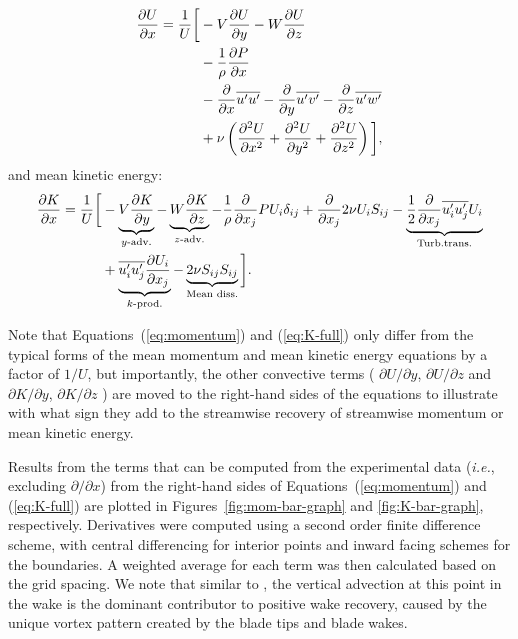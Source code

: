 \documentclass[energies,article,accept,moreauthors,pdftex,10pt,a4paper]{mdpi}
\def \p{\partial}
\theoremstyle{mdpi}
\newcounter{ex}
\newcounter{re}
\begin{document}
\begin{equation}
	\begin{split}
		\frac{\p U}{\p x} = 
		\frac{1}{U} \bigg{[}
		& - V\frac{\p U}{\p y}
		- W\frac{\p U}{\p z} \\
		& -\frac{1}{\rho}\frac{\p P}{\p x} \\
		& - \frac{\p}{\p x} \overline{u'u'}
		- \frac{\p}{\p y} \overline{u'v'}
		- \frac{\p}{\p z} \overline{u'w'} \\
		& + \nu\left(\frac{\p^2 U}{\p x^2}
		+ \frac{\p^2 U}{\p y^2}
		+ \frac{\p^2 U}{\p z^2} \right)
		\bigg{]},
	\end{split}
	\label{eq:momentum}
\end{equation}
and mean kinetic energy:
\begin{equation}
	\begin{split}
		\frac{\p K}{\p x}
		=
		\frac{1}{U}
		\bigg{[}
		& - \underbrace{V \frac{\p K}{\p y}}_{y\text{-adv.%
		}}
		- \underbrace{W \frac{\p K}{\p z}}_{z\text{-adv.}}
		- \frac{1}{\rho}\frac{\p}{\p x_j} P U_i \delta_{ij}
		+ \frac{\p}{\p x_j} 2 \nu U_i S_{ij} %
		- \underbrace{
		\frac{1}{2}\frac{\p}{\p x_j} \overline{u_i' u_j'} U_i
		}_{\text{Turb.%
		trans.%
		}} \\
		& + 
		\underbrace{
		\overline{u_i' u_j'} \frac{\p U_i}{\p x_j}
		}_{k\text{-prod.%
		}}
		- 
		\underbrace{
		2 \nu S_{ij}S_{ij}
		}_{\text{Mean diss.%
		}}
		\bigg{]}.
	\label{eq:K-full}
	\end{split}
\end{equation}

Note that Equations~(\ref{eq:momentum}) and (\ref{eq:K-full}) only differ from the
typical forms of the mean momentum and mean kinetic energy equations by a factor
of $1/U$, but importantly, the other convective terms ( $\partial U/\partial y$,
$\partial U/\partial z$ and $\partial K/\partial y$, $\partial K/\partial z$ )
are moved to the right-hand sides of the equations to illustrate with what sign
they add to the streamwise recovery of streamwise momentum or mean kinetic
energy.

Results from the terms that can be computed from the experimental data (\emph{i.e.},
excluding $\partial / \partial x$) from the right-hand sides of
Equations~(\ref{eq:momentum}) and (\ref{eq:K-full}) are plotted in
Figures~\ref{fig:mom-bar-graph} and \ref{fig:K-bar-graph}, respectively.
Derivatives were computed using a second order finite difference scheme, with
central differencing for interior points and inward facing schemes for the
boundaries. A weighted average for each term was then calculated based on the
grid spacing. We note that similar to \cite{Bachant2015-JoT}, the vertical
advection at this point in the wake is the dominant contributor to positive wake
recovery, caused by the unique vortex pattern created by the blade tips and
blade wakes.
\end{document}
